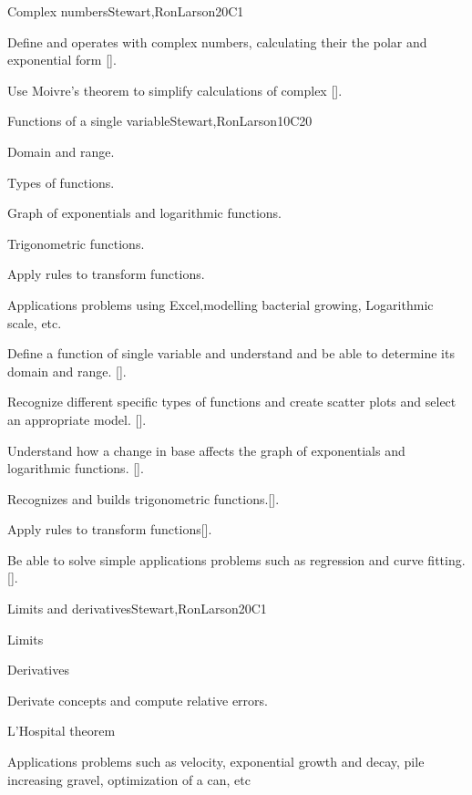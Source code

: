 \begin{syllabus}
\begin{unit}{Complex numbers}{}{Stewart,RonLarson}{20}{C1}
   \begin{learningoutcomes}
      \item Define and operates with complex numbers, calculating their the polar and exponential form [\Assessment].
      \item Use Moivre's theorem to simplify calculations of complex [\Assessment].
      \end{learningoutcomes}
\end{unit}

\begin{unit}{Functions of a single variable}{}{Stewart,RonLarson}{10}{C20}
  \begin{topics}
    \item Domain and range.
    \item Types of functions.
    \item Graph of exponentials and logarithmic functions.
    \item Trigonometric functions.
    \item Apply rules to transform functions.
    \item Applications problems using Excel,modelling bacterial growing, Logarithmic scale, etc.
  \end{topics}

   \begin{learningoutcomes}
      \item Define a function of single variable and understand and be able to determine its domain and range. [\Assessment].
      \item Recognize different specific types of functions and create scatter plots and select an appropriate model. [\Assessment].
      \item Understand how a change in base affects the graph of exponentials and logarithmic functions. [\Assessment].
      \item Recognizes and builds trigonometric functions.[\Assessment].
      \item Apply rules to transform functions[\Assessment].
      \item Be able to solve simple applications problems such as regression and curve fitting. [\Assessment].
      \end{learningoutcomes}
\end{unit}

\begin{unit}{Limits and derivatives}{}{Stewart,RonLarson}{20}{C1}
   \begin{topics}
      \item Limits
      \item Derivatives
      \item Derivate concepts and compute relative errors.
      \item L'Hospital theorem 
      \item Applications problems such as velocity, exponential growth and decay, pile increasing gravel, optimization of a can, etc
   \end{topics}


\end{unit}
\end{syllabus}
